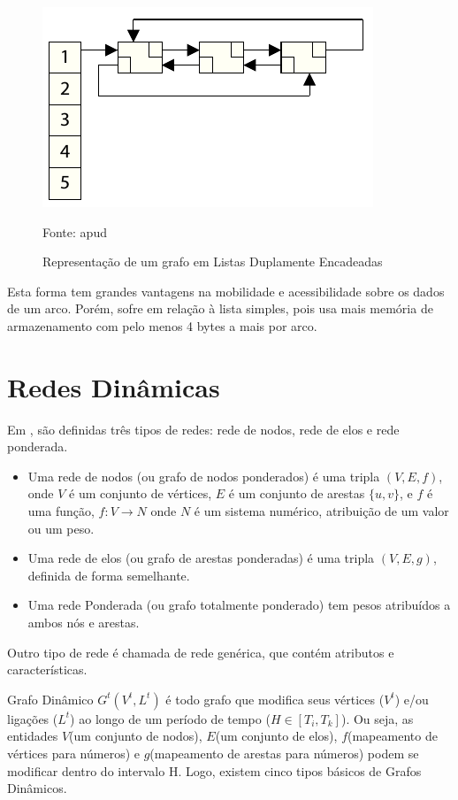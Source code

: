 \begin{figure}[htbp]
\centering
 \includegraphics[width=.65\textwidth]{chapters/fig/listdupla.png}
\caption{Representação de um grafo em Listas Duplamente Encadeadas}
Fonte: \cite{dynagraph} apud \cite{negreirosbook}
\label{fig:listdupla}
\end{figure}

Esta forma tem grandes vantagens na mobilidade e acessibilidade sobre os dados de um arco.
Porém, sofre em relação à lista simples, pois usa mais memória de armazenamento com pelo
menos 4 bytes a mais por arco.

\pagebreak

\section{Redes Dinâmicas}

Em \cite{harary}, são definidas três tipos de redes: rede de nodos, rede de elos e rede ponderada.
\begin{itemize}
\item Uma rede de nodos (ou grafo de nodos ponderados) é uma tripla $(V, E, f)$, onde $V$ é um conjunto
de vértices, $E$ é um conjunto de arestas $\{u,v\}$, e $f$ é uma função, $f: V \rightarrow N$ onde $N$
é um sistema numérico, atribuição de um valor ou um peso.
\item Uma rede de elos (ou grafo de arestas ponderadas) é uma tripla $(V, E, g)$, definida de forma semelhante.
\item Uma rede Ponderada (ou grafo totalmente ponderado) tem pesos atribuídos a ambos nós e arestas.
\end{itemize}

Outro tipo de rede é chamada de rede genérica, que contém atributos e características.

Grafo Dinâmico $G^t(V^t, L^t)$ é todo grafo que modifica seus vértices ($V^t$) e/ou ligações ($L^t$)
ao longo de um período de tempo ($H \in [T_i, T_k]$). Ou seja, as entidades $V$(um conjunto de nodos),
$E$(um conjunto de elos), $f$(mapeamento de vértices para números) e $g$(mapeamento de arestas para números)
podem se modificar dentro do intervalo H.
Logo, existem cinco tipos básicos de Grafos Dinâmicos.


